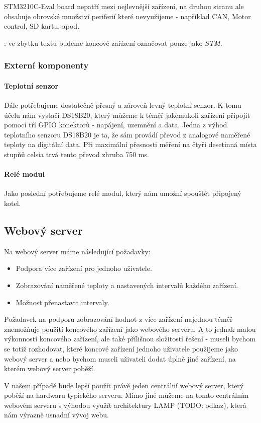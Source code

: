 STM3210C-Eval board nepatří mezi nejlevnější zařízení, na druhou stranu ale obsahuje obrovské
množství periferií které nevyužijeme - například CAN, Motor control, SD kartu, apod.

: ve zbytku textu budeme koncové zařízení označovat pouze jako \emph{STM}.

\subsubsection{Externí komponenty}
\paragraph{Teplotní senzor}
Dále potřebujeme dostatečně přesný a zároveň levný teplotní senzor.
K tomu účelu nám vystačí DS18B20, který můžeme k téměř jakémukoli zařízení připojit pomocí tří
GPIO konektorů - napájení, uzemnění a data.
Jedna z výhod teplotního senzoru DS18B20 je ta, že sám provádí převod z analogové naměřené
teploty na digitální data.
Při maximální přesnosti měření na čtyři desetinná místa stupňů celsia trvá tento převod zhruba
750 ms.

\paragraph{Relé modul}
Jako poslední potřebujeme relé modul, který nám umožní spouštět připojený kotel.


\subsection{Webový server}
Na webový server máme následující požadavky:
\begin{itemize}
  \item Podpora více zařízení pro jednoho uživatele.
  \item Zobrazování naměřené teploty a nastavených intervalů každého zařízení.
  \item Možnost přenastavit intervaly.
\end{itemize}

Požadavek na podporu zobrazování hodnot z více zařízení najednou téměř znemožňuje použití koncového
zařízení jako webového serveru.
A to jednak malou výkonností koncového zařízení, ale také přílišnou složitostí řešení - museli bychom
se totiž rozhodovat, které koncové zařízení jednoho uživatele použijeme jako webový server a nebo bychom
museli uživateli dodat úplně jiné zařízení, na kterém webový server poběží.

V našem případě bude lepší použít právě jeden centrální webový server, který poběží na hardwaru typického
serveru.
Mimo jiné můžeme na tomto centrálním webovém serveru s výhodou využít architektury LAMP (TODO: odkaz),
která nám výrazně usnadní vývoj webu.
